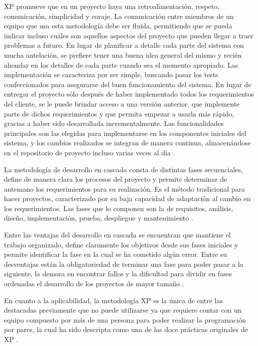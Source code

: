 \documentclass{article}
\begin{document}
XP promueve que en un proyecto haya una retroalimentación, respeto, comunicación, simplicidad y coraje. La comunicación entre miembros de un equipo que usa esta metodología debe ser fluida, permitiendo que se pueda indicar incluso cuáles son aquellos aspectos del proyecto que pueden llegar a traer problemas a futuro. En lugar de planificar a detalle cada parte del sistema con mucha antelación, se prefiere tener una buena idea general del mismo y recién ahondar en los detalles de cada parte cuando sea el momento apropiado. Las implementación se caracteriza por ser simple, buscando pasar los tests confeccionados para asegurarse del buen funcionamiento del sistema. En lugar de entregar el proyecto sólo después de haber implementado todos los requerimientos del cliente, se le puede brindar acceso a una versión anterior, que implemente parte de dichos requerimientos y que permita empezar a usarla más rápido, gracias a haber sido desarrollada incrementalmente. Las funcionalidades principales son las elegidas para implementarse en los componentes iniciales del sistema, y los cambios realizados se integran de manera continua, almacenándose en el repositorio de proyecto incluso varias veces al día \parencite{agileProjectManagement}.

La metodología de desarrollo en cascada consta de distintas fases secuenciales, define de manera clara los procesos del proyecto y permite determinar de antemano los requerimientos para su realización. Es el método tradicional para hacer proyectos, caracterizado por su baja capacidad de adaptación al cambio en los requerimientos. Las fases que lo componen son la de requisitos, análisis, diseño, implementación, prueba, despliegue y mantenimiento \parencite{iepWaterfall}.

Entre las ventajas del desarrollo en cascada se encuentran que mantiene el trabajo organizado, define claramente los objetivos desde sus fases iniciales y permite identificar la fase en la cual se ha cometido algún error. Entre su desventajas están la obligatoriedad de terminar una fase para poder pasar a la siguiente, la demora en encontrar fallos y la dificultad para dividir en fases ordenadas el desarrollo de los proyectos de mayor tamaño \parencite{crehanaWaterfall}.

En cuanto a la aplicabilidad, la metodología XP es la única de entre las destacadas previamente que no puede utilizarse ya que requiere contar con un equipo compuesto por más de una persona para poder realizar la programación por pares, la cual ha sido descripta como una de las doce prácticas originales de XP \parencite{agileAlliance}.
\end{document}
